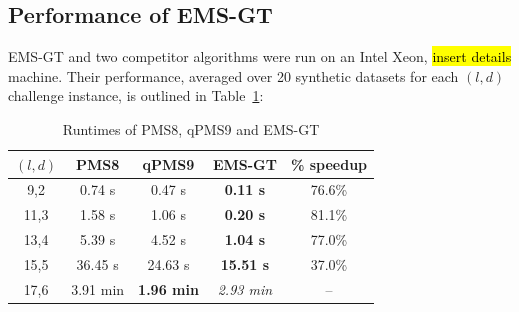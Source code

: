 \documentclass{acm_proc_article-sp}
\begin{document}

	\newpage
	\subsection{Performance of EMS-GT}
		EMS-GT and two competitor algorithms were run on an Intel Xeon, \hl{insert details} machine. Their performance, averaged over 20 synthetic datasets for each $(l,d)$ challenge instance, is outlined in Table~\ref{tbl:runtimes_v_pms}:

		\begin{table}[ht] %
			\small
			\renewcommand{\arraystretch}{1.3}
			\caption{\small Runtimes of PMS8, qPMS9 and EMS-GT}
			\label{tbl:runtimes_v_pms}
			\centering
			\begin{tabular}{|c|c|c|c|c|}
			\hline \bfseries\boldmath $(l,d)$ & \bfseries PMS8 & \bfseries qPMS9 & \bfseries EMS-GT & \bfseries \% speedup\\
			\hline
			 9,2 &  0.74 s  &  0.47 s & {\bf 0.11 s} & 76.6\%\\
			11,3 &  1.58 s  &  1.06 s & {\bf 0.20 s} & 81.1\%\\
			13,4 &  5.39 s  &  4.52 s & {\bf 1.04 s} & 77.0\%\\
			15,5 & 36.45 s  & 24.63 s & {\bf15.51 s} & 37.0\%\\
			17,6 &  3.91 min & \textbf{1.96 min} & {\emph{2.93 min}} & --\\
			\hline\end{tabular}
			\end{table}
\end{document}
